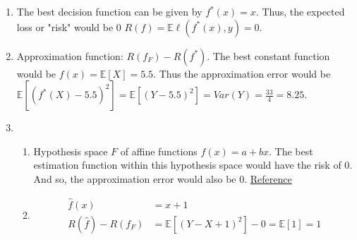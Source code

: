 \begin{enumerate}

    \item The best decision function can be given by $f^{*}(x) = x$. Thus, the expected loss or "risk" would be 0 $R(f) = \mathbb{E} \ell (f^{*}(x), y) = 0$. 

    \item Approximation function: $R(f_{F}) - R(f^{*})$. The best constant function would be $f(x) = \mathbb{E}[X] = 5.5$. Thus the approximation error would be $\mathbb{E}[(f^{*}(X) - 5.5)^{2}] = \mathbb{E}[(Y - 5.5)^{2}] = Var(Y) = \frac{33}{4} = 8.25$.

    \item 
    	\begin{enumerate}
	    	\item Hypothesis space $F$ of affine functions $f(x) = a + bx$. The best estimation function within this hypothesis space would have the risk of 0. And so, the approximation error would also be 0.  \href{https://davidrosenberg.github.io/ml2017/#lectures}{Reference}

		    \item 
        		\begin{align*}
		            \hat{f}(x) & = x + 1 \\
        		    R(\hat{f}) - R(f_{F}) & = \mathbb{E}[(Y - X + 1)^{2}] - 0 = \mathbb{E}[1] = 1
		        \end{align*}
		 \end{enumerate}

\end{enumerate}
